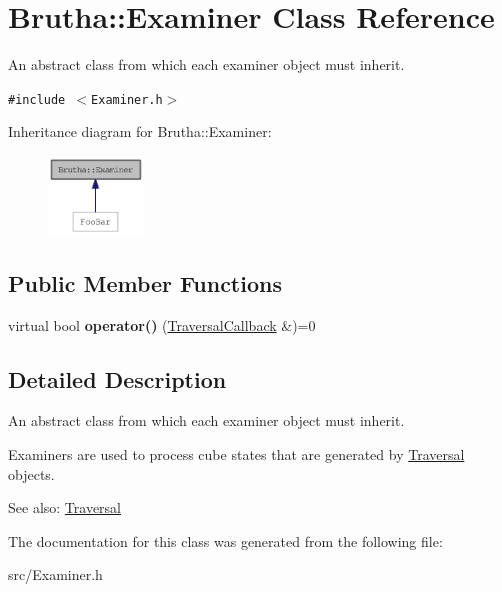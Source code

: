 \hypertarget{classBrutha_1_1Examiner}{
\section{Brutha::Examiner Class Reference}
\label{classBrutha_1_1Examiner}
}
An abstract class from which each examiner object must inherit.  


{\tt \#include $<$Examiner.h$>$}

Inheritance diagram for Brutha::Examiner:\nopagebreak
\begin{figure}[H]
\begin{center}
\leavevmode
\includegraphics[width=71pt]{classBrutha_1_1Examiner__inherit__graph}
\end{center}
\end{figure}
\subsection*{Public Member Functions}
\begin{CompactItemize}
\item 
\hypertarget{classBrutha_1_1Examiner_cdb51602511acc68751aca346e6381f5}{
virtual bool \textbf{operator()} (\hyperlink{classBrutha_1_1TraversalCallback}{TraversalCallback} \&)=0}
\label{classBrutha_1_1Examiner_cdb51602511acc68751aca346e6381f5}

\end{CompactItemize}


\subsection{Detailed Description}
An abstract class from which each examiner object must inherit. 

Examiners are used to process cube states that are generated by \hyperlink{classBrutha_1_1Traversal}{Traversal} objects.

\begin{Desc}
\item[See also:]\hyperlink{classBrutha_1_1Traversal}{Traversal} \end{Desc}


The documentation for this class was generated from the following file:\begin{CompactItemize}
\item 
src/Examiner.h\end{CompactItemize}
